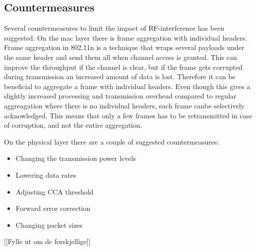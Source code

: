 	\subsection{Countermeasures}
	Several countermeasures to limit the impact of RF-interference has been suggested.
	On the mac layer there is frame aggregation with individual headers.
	Frame aggregation in 802.11n is a technique that wraps several payloads under the same
	header and send them all when channel access is granted. This can improve the throughput
	if the channel is clear, but if the frame gets corrupted during transmission
	an increased amount of data is lost.
	Therefore it can be beneficial to aggregate a frame with individual headers.
	Even though this gives a slightly increased processing and transmission overhead
	compared to regular aggreagation where there is no individual headers, 
	each frame canbe selectively acknowledged.
	This means that only a few frames has to be retransmitted in case of corruption,
	and not the entire aggregation. 

	On the physical layer there are a couple of suggested countermeasures:
	\begin{itemize}
	\item Changing the transmission power levels
	\item Lowering data rates
	\item Adjusting CCA threshold
	\item Forward error correction
	\item Changing packet sizes
	\end{itemize}
	[[Fylle ut om de forskjellige]]



